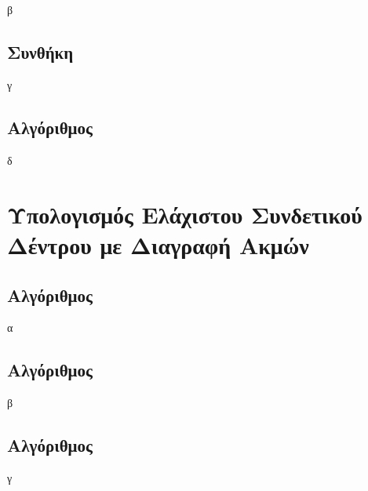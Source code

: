 \documentclass[a4paper,10pt]{article}
\begin{document}
\subsection{}
β
\subsection{Συνθήκη}
γ
\subsection{Αλγόριθμος}
δ


\section{Υπολογισμός Ελάχιστου Συνδετικού Δέντρου με Διαγραφή Ακμών}
\subsection{Αλγόριθμος}
α
\subsection{Αλγόριθμος}
β
\subsection{Αλγόριθμος}
γ

\end{document}

